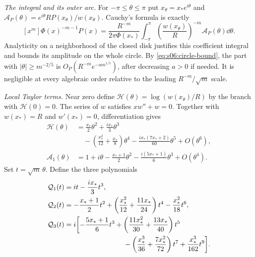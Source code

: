 \begin{prf}
\emph{The integral and its outer arc.}
For $-\pi\leq\theta\leq\pi$ put $x_\theta=x_*e^{i\theta}$
and
$\mathcal A_P(\theta)=e^{i\theta}R P(x_\theta)/w(x_\theta)$.
Cauchy's formula is exactly
\begin{equation}\label{eq:s06:cauchy}
 [x^m]\Phi(x)^{-m-1}P(x)
 =\frac{R^{-m}}{2\pi\Phi(x_*)}
 \int_{-\pi}^{\pi}
 \left(\frac{w(x_\theta)}R\right)^{-m}
                         \mathcal A_P(\theta)\dd\theta.
\end{equation}
Analyticity on a neighborhood of the closed disk justifies this
coefficient integral and bounds its amplitude on the whole circle. By
\eqref{eq:s06:circle-bound}, the part with
$|\theta|\geq m^{-2/5}$ is
$O_P(R^{-m}e^{-a m^{1/5}})$, after decreasing $a>0$ if needed.
It is negligible at every algebraic order relative to the leading
$R^{-m}/\sqrt m$ scale.

\emph{Local Taylor terms.}
Near zero define
$\mathcal H(\theta)=\log(w(x_\theta)/R)$ by the branch with
$\mathcal H(0)=0$. The series of $w$ satisfies $xw''+w=0$.
Together with $w(x_*)=R$ and $w'(x_*)=0$, differentiation gives
\begin{align*}
 \mathcal H(\theta)
 &=\frac{x_*}{2}\theta^2+\frac{i x_*}{3}\theta^3\\
 &\quad-\left(\frac{x_*^2}{12}+\frac{x_*}{8}\right)\theta^4
   -\frac{i x_*(7x_*+2)}{60}\theta^5+O(\theta^6),\\
 \mathcal A_1(\theta)
 &=1+i\theta-\frac{x_*+1}{2}\theta^2
                    -\frac{i(5x_*+1)}6\theta^3+O(\theta^4).
\end{align*}
Set $t=\sqrt m\,\theta$.
Define the three polynomials
\begin{align*}
 \mathcal Q_1(t)&=it-\frac{i x_*}{3}t^3,\\
 \mathcal Q_2(t)&=-\frac{x_*+1}{2}t^2
       +\left(\frac{x_*^2}{12}+\frac{11x_*}{24}\right)t^4
       -\frac{x_*^2}{18}t^6,\\
 \mathcal Q_3(t)&=i\biggl[-\frac{5x_*+1}{6}t^3
       +\left(\frac{11x_*^2}{30}+\frac{13x_*}{40}\right)t^5\\
 &\hspace{30mm}
       -\left(\frac{x_*^3}{36}+\frac{7x_*^2}{72}\right)t^7
       +\frac{x_*^3}{162}t^9\biggr].
\end{align*}


\end{prf}
